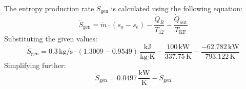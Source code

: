 The entropy production rate \( \dot{S}_{\text{gen}} \) is calculated using the following equation:  
\[
\dot{S}_{\text{gen}} = \dot{m} \cdot (s_a - s_e) - \frac{\dot{Q}_{R}}{T_{12}} - \frac{\dot{Q}_{\text{out}}}{T_{\text{KF}}}
\]  
Substituting the given values:  
\[
\dot{S}_{\text{gen}} = 0.3 \, \text{kg/s} \cdot (1.3009 - 0.9549) \, \frac{\text{kJ}}{\text{kg·K}} - \frac{100 \, \text{kW}}{337.75 \, \text{K}} - \frac{-62.782 \, \text{kW}}{793.122 \, \text{K}}
\]  
Simplifying further:  
\[
\dot{S}_{\text{gen}} = 0.0497 \, \frac{\text{kW}}{\text{K}} - \dot{S}_{\text{gen}}
\]